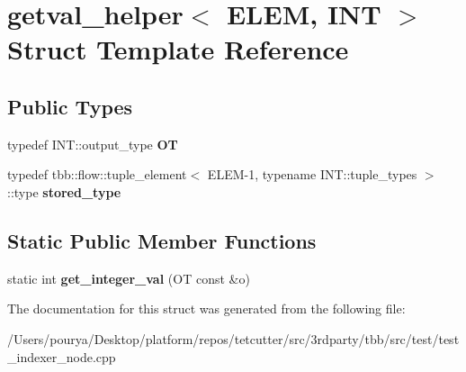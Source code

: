 \hypertarget{structgetval__helper}{}\section{getval\+\_\+helper$<$ E\+L\+E\+M, I\+N\+T $>$ Struct Template Reference}
\label{structgetval__helper}
\subsection*{Public Types}
\begin{DoxyCompactItemize}
\item 
\hypertarget{structgetval__helper_a11e447b9d76c5665dc00be747e1760f9}{}typedef I\+N\+T\+::output\+\_\+type {\bfseries O\+T}\label{structgetval__helper_a11e447b9d76c5665dc00be747e1760f9}

\item 
\hypertarget{structgetval__helper_a14b38dfe3b25b7d42de0089ecca60c3d}{}typedef tbb\+::flow\+::tuple\+\_\+element$<$ E\+L\+E\+M-\/1, typename I\+N\+T\+::tuple\+\_\+types $>$\+::type {\bfseries stored\+\_\+type}\label{structgetval__helper_a14b38dfe3b25b7d42de0089ecca60c3d}

\end{DoxyCompactItemize}
\subsection*{Static Public Member Functions}
\begin{DoxyCompactItemize}
\item 
\hypertarget{structgetval__helper_a59cf9a3b735bf16002569ce2a4e1f614}{}static int {\bfseries get\+\_\+integer\+\_\+val} (O\+T const \&o)\label{structgetval__helper_a59cf9a3b735bf16002569ce2a4e1f614}

\end{DoxyCompactItemize}


The documentation for this struct was generated from the following file\+:\begin{DoxyCompactItemize}
\item 
/\+Users/pourya/\+Desktop/platform/repos/tetcutter/src/3rdparty/tbb/src/test/test\+\_\+indexer\+\_\+node.\+cpp\end{DoxyCompactItemize}

